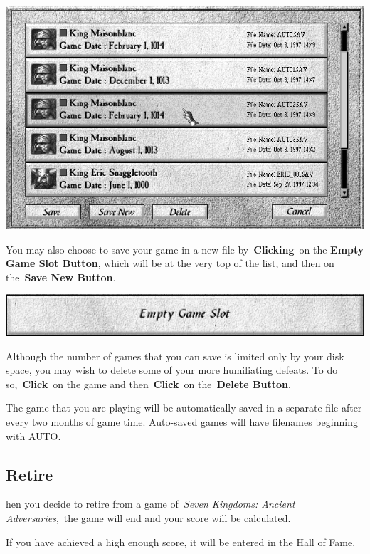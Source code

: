 \begin{center}
	\includegraphics[width=0.9\linewidth]{Isavegame}
\end{center}

You may also choose to save your game in a new file by \textbf{Clicking} on the \textbf{Empty Game Slot Button}, which will be at the very top of the list, and then on the \textbf{Save New Button}.

\begin{center}
	\includegraphics[width=0.7\linewidth]{Isavegame_emptyslot}
\end{center}

Although the number of games that you can save is limited only by your disk space, you may wish to delete some of your more humiliating defeats. To do so, \textbf{Click} on the game and then \textbf{Click} on the \textbf{Delete Button}.

The game that you are playing will be automatically saved in a separate file after every two months of game time. Auto-saved games will have filenames beginning with AUTO.

\subsection{Retire}


hen you decide to retire from a game of \textit{Seven Kingdoms: Ancient Adversaries}, the game will end and your score will be calculated.

If you have achieved a high enough score, it will be entered in the Hall of Fame.

